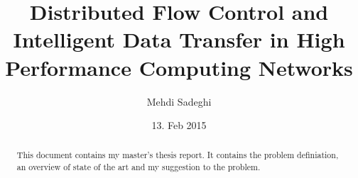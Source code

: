 \documentclass[a4paper, 12pt]{report}
\title{Distributed Flow Control and Intelligent Data Transfer in High Performance Computing Networks}
\author{Mehdi Sadeghi}
\date{13. Feb 2015}
\begin{document}
\nocite{*} %


\maketitle


\begin{abstract}
This document contains my master's thesis report. It contains the problem definiation,
an overview of state of the art and my suggestion to the problem.
\end{abstract}


\tableofcontents







\printbibliography[heading=bibintoc, title={References}]
\end{document}
